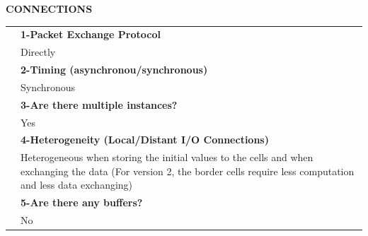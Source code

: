 {\large\textbf{CONNECTIONS}}\vspace{10pt}\\\begin{tabular}{ p{0.2cm} p{14.5cm}}
	&\textbf{1-Packet Exchange Protocol}\\
	&Directly\vspace{7pt}\\
	&\textbf{2-Timing (asynchronou/synchronous)}\\
	&Synchronous\vspace{7pt}\\
	&\textbf{3-Are there multiple instances? }\\
	&Yes\vspace{7pt}\\
	&\textbf{4-Heterogeneity (Local/Distant I/O Connections)}\\
	&Heterogeneous when storing the initial values to the cells and when exchanging the data (For version 2, the border cells require less computation and less data exchanging)\vspace{7pt}\\
	&\textbf{5-Are there any buffers?}\\
	&No
\end{tabular}\vspace{14pt}\\
